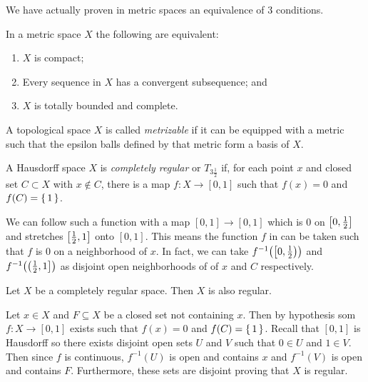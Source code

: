 \documentclass[letterpaper, 11pt, oneside]{book}
\begin{document}
We have actually proven in metric spaces an equivalence of 3 conditions.

\begin{cor}
  In a metric space $X$ the following are equivalent:
  \begin{enumerate}
  \item $X$ is compact;
  \item Every sequence in $X$ has a convergent subsequence; and
  \item $X$ is totally bounded and complete.
  \end{enumerate}
\end{cor}

\begin{defn}[Metrizable]
  A topological space $X$ is called \emph{metrizable} if it can be equipped with a metric such that the epsilon balls defined by that metric form a basis of $X$.
\end{defn}

\clearpage

\begin{defn}\label{defn: completely_regular}
  A Hausdorff space $X$ is \emph{completely regular} or $T_{3 \frac{1}{2}}$ if, for each point $x$ and closed set $C \subset X$ with $x \notin C$, there is a map $f\colon X \to [0, 1]$ such that $f(x) = 0$ and $f(C) = \set{1}$.
\end{defn}

We can follow such a function with a map $[0, 1] \to [0, 1]$ which is $0$ on $\bqty{0, \frac{1}{2}}$ and stretches $\bqty{\frac{1}{2}, 1}$ onto $[0, 1]$.
This means the function $f$ in  can be taken such that $f$ is $0$ on a neighborhood of $x$.
In fact, we can take $f^{-1}\pqty{\left[ 0, \frac{1}{2} \right)}$ and $f^{-1}\pqty{\left( \frac{1}{2}, 1 \right]}$ as disjoint open neighborhoods of of $x$ and $C$ respectively.

\begin{prop}\label{prop: comp_reg_is_reg}
  Let $X$ be a completely regular space.
  Then $X$ is also regular.
\end{prop}
\begin{pf}
  Let $x \in X$ and $F \subseteq X$ be a closed set not containing $x$.
  Then by hypothesis som $f\colon X \to [0, 1]$ exists such that $f(x) = 0$ and $f(C) = \set{1}$.
  Recall that $[0, 1]$ is Hausdorff so there exists disjoint open sets $U$ and $V$ such that $0 \in U$ and $1 \in V$.
  Then since $f$ is continuous, $f^{-1}(U)$ is open and contains $x$ and $f^{-1}(V)$ is open and contains $F$.
  Furthermore, these sets are disjoint proving that $X$ is regular.
\end{pf}
\end{document}
